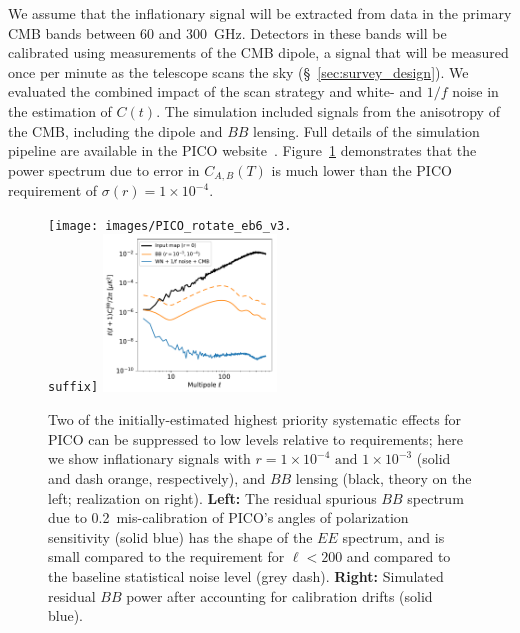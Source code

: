 \documentclass[PICOReport.tex]{subfiles}
\begin{document}
We assume that the inflationary signal will be extracted from data in the primary CMB bands between 60 and 300~GHz.  Detectors in these bands will be calibrated using measurements of the CMB dipole, a signal that will be measured once per minute as the telescope scans the sky (\S~\ref{sec:survey_design}).  We evaluated the combined impact of the scan strategy and white- and $1/f$ noise in the estimation of $C(t)$.
The simulation included signals from the anisotropy of the CMB, including the dipole and $BB$ lensing. Full details of the simulation pipeline are available in the PICO website~\citep{picoweb_dipole}. Figure~\ref{fig:rot_bb_tb_eb} demonstrates that the power spectrum due to error in $C_{A,B} (T)$ is much lower than the PICO requirement of $\sigma(r) = 1\times 10^{-4}$. 
\begin{figure}[thb]
\centerline{
\texttt{[image: images/PICO\_rotate\_eb6\_v3.\\suffix]} 
\hspace{0.3in}
\includegraphics[width=0.41\textwidth]{images/calibration_spectrum_BB.pdf} }
\vspace{-0.1in}
\caption{\captiontext
Two of the initially-estimated highest priority systematic effects for PICO can be suppressed to low levels relative to requirements; here we show inflationary signals with  $r = 1\times 10^{-4}\,\, \mbox{and} \,\, 1\times 10^{-3}$ (solid and dash orange, respectively), and $BB$ lensing (black, theory on the left; realization on right). {\bf Left:} The residual spurious $BB$ spectrum due to 0.2\arcmin\ mis-calibration of PICO's angles of polarization sensitivity (solid blue) has the shape of the $EE$ spectrum, and is small compared to the requirement for $\ell<200$ and compared to the baseline statistical noise level (grey dash). {\bf Right:} Simulated residual $BB$ power after accounting for calibration drifts (solid blue). 
\label{fig:rot_bb_tb_eb} }
\vspace{-0.1in}
\end{figure}
\end{document}
